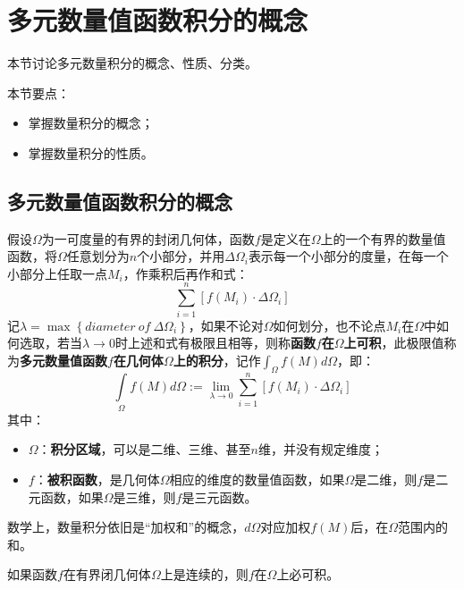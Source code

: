 \section{多元数量值函数积分的概念}

本节讨论多元数量积分的概念、性质、分类。

本节要点：
\begin{itemize}
    \item 掌握数量积分的概念；
    \item 掌握数量积分的性质。
\end{itemize}

\subsection{多元数量值函数积分的概念}

\begin{definition}[数量积分]
假设$\varOmega $为一可度量的有界的封闭几何体，函数$f$是定义在$\varOmega $上的一个有界的数量值函数，将$\varOmega $任意划分为$n$个小部分，并用$\Delta \varOmega _i$表示每一个小部分的度量，在每一个小部分上任取一点$M_i$，作乘积后再作和式：
\[
\sum_{i=1}^n{\left[ f\left( M_i \right) \cdot \Delta \varOmega _i \right]}
\]
记$\lambda =\max \left\{ diameter \ of \ \Delta \varOmega _i \right\} $，如果不论对$\varOmega $如何划分，也不论点$M_i$在$\varOmega $中如何选取，若当$\lambda \rightarrow 0$时上述和式有极限且相等，则称{\bf 函数$f$在$\varOmega $上可积}，此极限值称为{\bf 多元数量值函数$f$在几何体$\varOmega $上的积分}，记作$\int_{\varOmega}{f\left( M \right) d\varOmega}$，即：
\[
\int\limits_{\varOmega}{f\left( M \right) d\varOmega}:=\underset{\lambda \rightarrow 0}{\lim}\sum_{i=1}^n{\left[ f\left( M_i \right) \cdot \Delta \varOmega _i \right]}
\]
其中：
\begin{itemize}
    \item $\varOmega $：{\bf 积分区域}，可以是二维、三维、甚至$n$维，并没有规定维度；
    \item $f$：{\bf 被积函数}，是几何体$\varOmega $相应的维度的数量值函数，如果$\varOmega $是二维，则$f$是二元函数，如果$\varOmega $是三维，则$f$是三元函数。
\end{itemize}
\end{definition}

数学上，数量积分依旧是“加权和”的概念，$d\varOmega $对应加权$f\left( M \right) $后，在$\varOmega $范围内的和。

\begin{theorem}[存在性定理]
如果函数$f$在有界闭几何体$\varOmega $上是连续的，则$f$在$\varOmega $上必可积。
\end{theorem}


